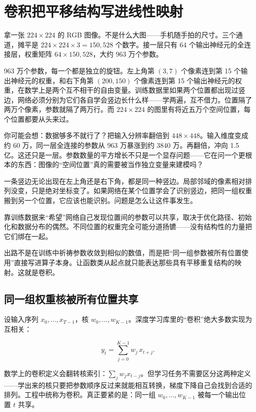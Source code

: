 \section{卷积把平移结构写进线性映射}
\label{sec:14-Deep-Learning/04-Convolutional-Networks/01}

拿一张 \(224\times 224\) 的 RGB 图像。不是什么大图——手机随手拍的尺寸。三个通道，摊平是 \(224\times 224\times 3 = 150{,}528\) 个数字。接一层只有 64 个输出神经元的全连接层，权重矩阵 \(64\times 150{,}528\)，大约 963 万个参数。

963 万个参数，每一个都是独立的旋钮。左上角第 \((3,7)\) 个像素连到第 15 个输出神经元的权重，和右下角第 \((200,150)\) 个像素连到第 15 个输出神经元的权重，在数学上是两个互不相干的自由变量。训练数据里如果两个位置都出现过竖边，网络必须分别为它们各自学会竖边长什么样——学两遍，互不借力。位置隔了两万个像素，参数就隔了两万行。而 \(224\times 224\) 的图里有将近五万个空间位置，每个位置都要从头来过。

你可能会想：数据够多不就行了？把输入分辨率翻倍到 \(448\times 448\)。输入维度变成约 60 万，同一层全连接的参数从 963 万暴涨到约 3840 万。再翻倍，冲向 1.5 亿。这还只是一层。参数数量的平方增长不只是一个显存问题——它在问一个更根本的东西：图像的``空间位置''真的需要被当作独立变量来建模吗？

一条竖边无论出现在左上角还是右下角，都是同一种竖边。局部邻域的像素相对排列没变，只是绝对坐标变了。如果网络在某个位置学会了识别竖边，把同一组权重搬到另一个位置，它应该也能识别。问题是怎么让这件事发生。

靠训练数据来``希望''网络自己发现位置间的参数可以共享，取决于优化路径、初始化和数据分布的偶然。不同位置的权重完全可能分道扬镳——没有结构性的力量把它们绑在一起。

出路不是在训练中祈祷参数收敛到相似的数值，而是把``同一组参数被所有位置使用''直接写进算子本身。让函数类从起点就只能表达那些具有平移重复结构的映射。这就是卷积。

\subsection{同一组权重核被所有位置共享}

设输入序列 \(x_0,\ldots,x_{T-1}\)，核 \(w_0,\ldots,w_{K-1}\)。深度学习库里的``卷积''绝大多数实现为互相关：

\[
y_t = \sum_{j=0}^{K-1} w_j\, x_{t+j}.
\]

数学上的卷积定义会翻转核索引：\(\sum_j w_j x_{t-j}\)。但学习任务不需要区分这两种定义——学出来的核只要把参数顺序反过来就能相互转换，梯度下降自己会找到合适的排列。工程中统称为卷积。真正要紧的是：同一组 \(w_0,\ldots,w_{K-1}\) 被每一个输出位置 \(t\) 共享。

